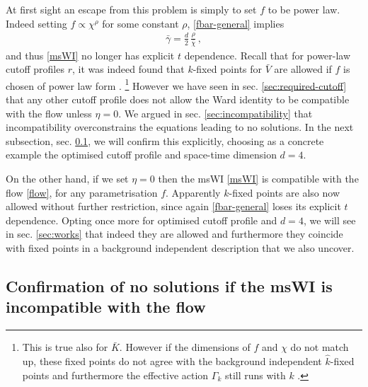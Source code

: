 \documentclass[11pt]{book} %
\newcommand{\bc}{\bar \chi}
\newcommand{\bV}{\bar V}
\newcommand{\bg}{\bar \gamma}
\numberwithin{equation}{chapter}
\begin{document}
At first sight an escape from this problem is simply to set $f$ to be power law.
Indeed setting $f\propto\chi^{\rho}$ for some constant $\rho$, \eqref{fbar-general} implies
\begin{align}
  \bg = \frac{d}{2} \, \frac{\rho}{\bc}\,,
  \label{powlaw-gamma}
\end{align}
and thus \eqref{msWI} no longer has explicit $t$ dependence.
Recall that for power-law cutoff profiles $r$, it was indeed found that $k$-fixed points for $\bV$
are allowed if $f$ is chosen of power law form \cite{Dietz:2015owa}.%
\footnote{This is true also for $\bar{K}$. However if the dimensions of $f$ and $\chi$ do not match up,
  these fixed points do not agree with the background independent $\hat{k}$-fixed points and furthermore
the effective action $\Gamma_k$ still runs with $k$ \cite{Dietz:2015owa}.}
However we have seen in sec. \ref{sec:required-cutoff} that any other cutoff profile does
not allow the Ward identity to be compatible with the flow unless $\eta=0$.
We argued in sec. \ref{sec:incompatibility} that incompatibility overconstrains the equations
leading to no solutions. In the next subsection, sec. \ref{sec:incompatible-no-solns},
we will confirm this explicitly, choosing as a concrete example the optimised cutoff profile and
space-time dimension $d=4$.

On the other hand, if we set $\eta=0$ then the msWI \eqref{msWI} is compatible with the flow \eqref{flow},
for any parametrisation $f$. Apparently $k$-fixed points are also now allowed without further restriction,
since again \eqref{fbar-general} loses its explicit $t$ dependence.
Opting once more for optimised cutoff profile and $d=4$, we will see in sec. \ref{sec:works} that
indeed they are allowed and furthermore they coincide with fixed points in a background independent
description that we also uncover.


\subsection{Confirmation of no solutions if the msWI is incompatible with the flow}
\label{sec:incompatible-no-solns}
\end{document}
